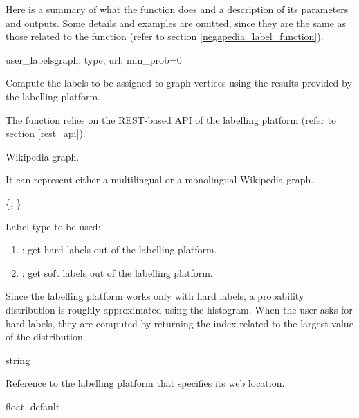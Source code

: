             Here is a summary of what the function does and a description of its parameters and outputs. Some details and examples are omitted, since they are the same as those related to the  function (refer to section \ref{negapedia_label_function}).
            \begin{independentfunctiondoc}{user\_labels}{graph, type, url, min\_prob=0}
                \begin{functiondescription}
                    Compute the labels to be assigned to graph vertices using the results provided by the labelling platform.
                    
                    The function relies on the REST-based API of the labelling platform (refer to section \ref{rest_api}).
                \end{functiondescription}
                
                \begin{functionparameters}
                    \item[graph] 
                    
                    Wikipedia graph.
                    
                    It can represent either a multilingual or a monolingual Wikipedia graph.
                    \item[type] \{, \}
                    
                    Label type to be used:
                    \begin{enumerate}
                        \item {}: get hard labels out of the labelling platform.
                        \item {}: get soft labels out of the labelling platform.
                    \end{enumerate}
                    
                    Since the labelling platform works only with hard labels, a probability distribution is roughly approximated using the histogram. When the user asks for hard labels, they are computed by returning the index related to the largest value of the distribution.
                    \item[url] string
                    
                    Reference to the labelling platform that specifies its web location.
                    \item[min\_prob] float, default 
                    

\end{functionparameters}
\end{independentfunctiondoc}
